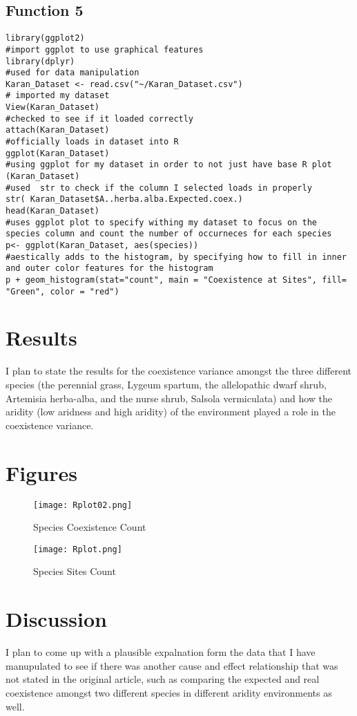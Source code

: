 \documentclass[letterpaper]{article}
\begin{document}
\subsection{Function 5}
\begin{verbatim}
library(ggplot2)
#import ggplot to use graphical features
library(dplyr)
#used for data manipulation
Karan_Dataset <- read.csv("~/Karan_Dataset.csv")
# imported my dataset
View(Karan_Dataset)
#checked to see if it loaded correctly
attach(Karan_Dataset)
#officially loads in dataset into R
ggplot(Karan_Dataset)
#using ggplot for my dataset in order to not just have base R plot
(Karan_Dataset)
#used  str to check if the column I selected loads in properly
str( Karan_Dataset$A..herba.alba.Expected.coex.)
head(Karan_Dataset)
#uses ggplot plot to specify withing my dataset to focus on the species column and count the number of occurneces for each species
p<- ggplot(Karan_Dataset, aes(species))
#aestically adds to the histogram, by specifying how to fill in inner and outer color features for the histogram
p + geom_histogram(stat="count", main = "Coexistence at Sites", fill= "Green", color = "red")
\end{verbatim}

\section{Results}
I plan to state the results for the coexistence variance amongst the three different species (the perennial grass, Lygeum
spartum, the allelopathic dwarf shrub, Artemisia herba-alba, and the nurse shrub, Salsola vermiculata) and how the aridity (low aridness and high aridity)  of the environment played a role in the coexistence variance.

\newpage
\section{Figures}

\begin{figure}[h]
	\caption{Species Coexistence Count\label{fig: Plot}}
	\centering
	\texttt{[image: Rplot02.png]}
\end{figure} 

\newpage
\begin{figure}[h]
\caption{Species Sites Count\label{fig: Plot}}
	\centering
	\texttt{[image: Rplot.png]}
\end{figure}


\newpage
\section{Discussion}
I plan to come up with a plausible expalnation form the data that I have manupulated to see if there was another cause and effect relationship that was not stated in the original article, such as comparing the expected and real coexistence amongst two different species in different aridity environments as well.
\end{document}
